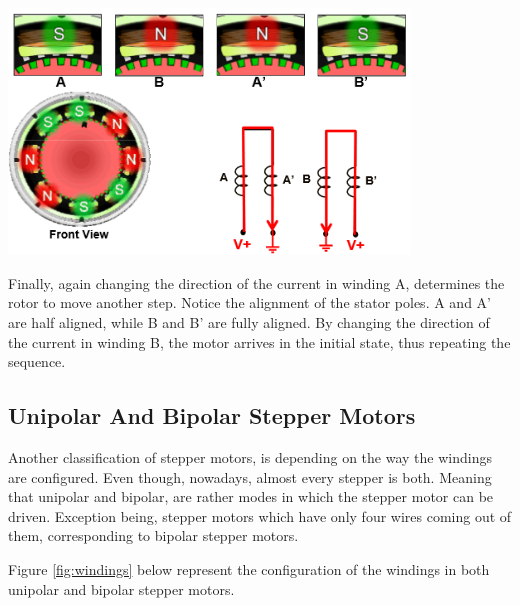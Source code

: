 \begin{center}
	\includegraphics[width=0.8\textwidth]{figures/move/motor35}
	\label{fig:hybrid_forth_step}
\end{center}


Finally, again changing the direction of the current in winding A, determines the rotor to move another step. Notice the alignment of the stator poles. A and A’ are half aligned, while B and B’ are fully aligned. By changing the direction of the current in winding B, the motor arrives in the initial state, thus repeating the sequence.
\newpage

\subsection{Unipolar And Bipolar Stepper Motors}

Another classification of stepper motors, is depending on the way the windings are configured.
Even though, nowadays, almost every stepper is both.
Meaning that unipolar and bipolar, are rather modes in which the stepper motor can be driven.
Exception being, stepper motors which have only four wires coming out of them, corresponding to bipolar stepper motors.

Figure \ref{fig:windings} below represent the configuration of the windings in both unipolar and bipolar stepper motors. 


